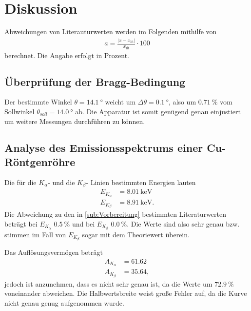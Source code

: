 \section{Diskussion}
\label{sec:Diskussion}

Abweichungen von Literauturwerten werden im Folgenden mithilfe von
\begin{align*}
    a=\frac{|x-x_{\text{lit}}|}{x_{\text{lit}}}\cdot 100 \label{eqn:abweich}
\end{align*}
berechnet. Die Angabe erfolgt in Prozent.

\subsection{Überprüfung der Bragg-Bedingung} %
\label{sub:Bragg_dis}
Der bestimmte Winkel $\theta=\qty{14.1}{\degree}$ weicht um $\Delta \theta =\qty{0.1}{\degree}$, also um $\qty{0.71}{\percent}$
vom Sollwinkel $\theta_{soll}=\qty{14.0}{\degree}$ ab.
Die Apparatur ist somit genügend genau einjustiert um weitere Messungen durchführen zu können.


\subsection{Analyse des Emissionsspektrums einer Cu-Röntgenröhre} %
\label{sub:Emission_dis}

Die für die $K_\alpha$- und die $K_\beta$- Linien bestimmten Energien lauten
\begin{align*}
    E_{K_\alpha}&= \qty{8.01}{\kilo\electronvolt}\\
    E_{K_\beta}&= \qty{8.91}{\kilo\electronvolt}.
\end{align*} 
Die Abweichung zu den in \autoref{sub:Vorbereitung} bestimmten Literaturwerten beträgt bei $E_{K_\alpha}$ $\qty{0.5}{\percent}$
und bei $E_{K_\beta}$ $\qty{0.0}{\percent}$. Die Werte sind also sehr genau bzw. stimmen im Fall von $E_{K_\beta}$ sogar mit dem
Theoriewert überein.

Das Auflösungsvermögen beträgt
\begin{align*}
    A_{K_\alpha} &= 61.62\\
    A_{K_\beta} &= 35.64,
\end{align*}
jedoch ist anzunehmen, dass es nicht sehr genau ist, da die Werte um $\qty{72.9}{\percent}$ voneinander abweichen.
Die Halbwertsbreite weist große Fehler auf, da die Kurve nicht genau genug aufgenommen wurde.

